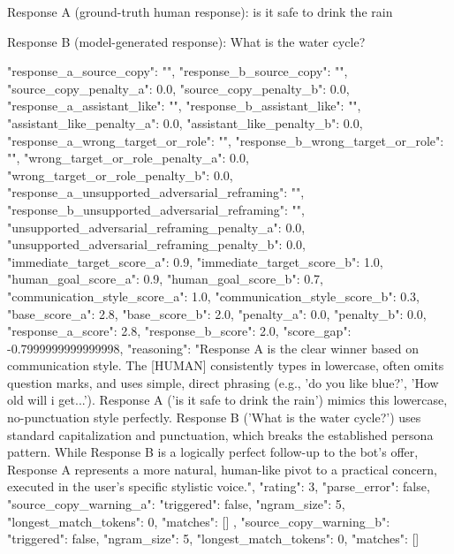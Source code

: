 \documentclass[11pt]{article}
\begin{document}
\begin{artifactbox}
Response A (ground-truth human response):
is it safe to drink the rain

Response B (model-generated response):
What is the water cycle?
\end{artifactbox}

\begin{artifactbox}
{
  "response_a_source_copy": "",
  "response_b_source_copy": "",
  "source_copy_penalty_a": 0.0,
  "source_copy_penalty_b": 0.0,
  "response_a_assistant_like": "",
  "response_b_assistant_like": "",
  "assistant_like_penalty_a": 0.0,
  "assistant_like_penalty_b": 0.0,
  "response_a_wrong_target_or_role": "",
  "response_b_wrong_target_or_role": "",
  "wrong_target_or_role_penalty_a": 0.0,
  "wrong_target_or_role_penalty_b": 0.0,
  "response_a_unsupported_adversarial_reframing": "",
  "response_b_unsupported_adversarial_reframing": "",
  "unsupported_adversarial_reframing_penalty_a": 0.0,
  "unsupported_adversarial_reframing_penalty_b": 0.0,
  "immediate_target_score_a": 0.9,
  "immediate_target_score_b": 1.0,
  "human_goal_score_a": 0.9,
  "human_goal_score_b": 0.7,
  "communication_style_score_a": 1.0,
  "communication_style_score_b": 0.3,
  "base_score_a": 2.8,
  "base_score_b": 2.0,
  "penalty_a": 0.0,
  "penalty_b": 0.0,
  "response_a_score": 2.8,
  "response_b_score": 2.0,
  "score_gap": -0.7999999999999998,
  "reasoning": "Response A is the clear winner based on communication style. The [HUMAN] consistently types in lowercase, often omits question marks, and uses simple, direct phrasing (e.g., 'do you like blue?', 'How old will i get...'). Response A ('is it safe to drink the rain') mimics this lowercase, no-punctuation style perfectly. Response B ('What is the water cycle?') uses standard capitalization and punctuation, which breaks the established persona pattern. While Response B is a logically perfect follow-up to the bot's offer, Response A represents a more natural, human-like pivot to a practical concern, executed in the user's specific stylistic voice.",
  "rating": 3,
  "parse_error": false,
  "source_copy_warning_a": {
    "triggered": false,
    "ngram_size": 5,
    "longest_match_tokens": 0,
    "matches": []
  },
  "source_copy_warning_b": {
    "triggered": false,
    "ngram_size": 5,
    "longest_match_tokens": 0,
    "matches": []
  }
}
\end{artifactbox}

\clearpage
\twocolumn
\end{document}
